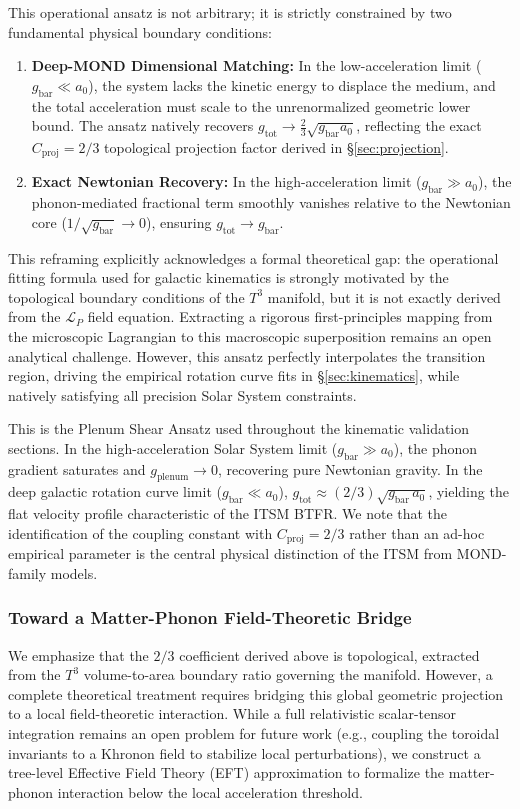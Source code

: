\documentclass[aps,prd,10pt,twocolumn,superscriptaddress,nofootinbib,floatfix]{revtex4-2}
\begin{document}
This operational ansatz is not arbitrary; it is strictly constrained by two fundamental physical boundary conditions:
\begin{enumerate}
    \item \textbf{Deep-MOND Dimensional Matching:} In the low-acceleration limit ($g_{\text{bar}} \ll a_0$), the system lacks the kinetic energy to displace the medium, and the total acceleration must scale to the unrenormalized geometric lower bound. The ansatz natively recovers $g_{\text{tot}} \to \frac{2}{3}\sqrt{g_{\text{bar}}a_0}$, reflecting the exact $C_{\text{proj}} = 2/3$ topological projection factor derived in \S\ref{sec:projection}.
    \item \textbf{Exact Newtonian Recovery:} In the high-acceleration limit ($g_{\text{bar}} \gg a_0$), the phonon-mediated fractional term smoothly vanishes relative to the Newtonian core ($1/\sqrt{g_{\text{bar}}} \to 0$), ensuring $g_{\text{tot}} \to g_{\text{bar}}$.
\end{enumerate}

This reframing explicitly acknowledges a formal theoretical gap: the operational fitting formula used for galactic kinematics is strongly motivated by the topological boundary conditions of the $T^3$ manifold, but it is not exactly derived from the $\mathcal{L}_P$ field equation. Extracting a rigorous first-principles mapping from the microscopic Lagrangian to this macroscopic superposition remains an open analytical challenge. However, this ansatz perfectly interpolates the transition region, driving the empirical rotation curve fits in \S\ref{sec:kinematics}, while natively satisfying all precision Solar System constraints.

This is the Plenum Shear Ansatz used throughout the kinematic validation sections. In the high-acceleration Solar System limit ($g_{\text{bar}} \gg a_0$), the phonon gradient saturates and $g_{\text{plenum}} \to 0$, recovering pure Newtonian gravity. In the deep galactic rotation curve limit ($g_{\text{bar}} \ll a_0$), $g_{\text{tot}} \approx (2/3)\sqrt{g_{\text{bar}}\,a_0}$, yielding the flat velocity profile characteristic of the ITSM BTFR. We note that the identification of the coupling constant with $C_{\text{proj}} = 2/3$ rather than an ad-hoc empirical parameter is the central physical distinction of the ITSM from MOND-family models. 

\subsubsection{Toward a Matter-Phonon Field-Theoretic Bridge}
We emphasize that the $2/3$ coefficient derived above is topological, extracted from the $T^3$ volume-to-area boundary ratio governing the manifold. However, a complete theoretical treatment requires bridging this global geometric projection to a local field-theoretic interaction. While a full relativistic scalar-tensor integration remains an open problem for future work (e.g., coupling the toroidal invariants to a Khronon field \cite{blanchet_skordis_khronon} to stabilize local perturbations), we construct a tree-level Effective Field Theory (EFT) approximation to formalize the matter-phonon interaction below the local acceleration threshold.
\end{document}
